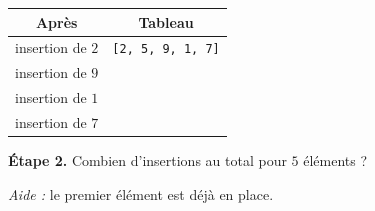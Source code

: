\bigskip

\begin{center}
\begin{tabular}{|c|c|}
\hline
\textbf{Après} & \textbf{Tableau} \\
\hline
insertion de $2$ & \texttt{[2, 5, 9, 1, 7]} \\
\hline
insertion de $9$ & \dotfill \\
\hline
insertion de $1$ & \dotfill \\
\hline
insertion de $7$ & \dotfill \\
\hline
\end{tabular}
\end{center}

\bigskip

\textbf{Étape 2.} Combien d'insertions au total pour $5$ éléments ?

\medskip
\dotfill

\medskip
\textit{Aide :} le premier élément est déjà en place.
